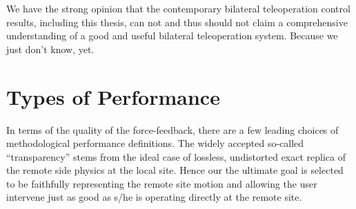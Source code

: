We have the strong opinion that the contemporary bilateral teleoperation control results, including this thesis, 
can not and thus should not claim a comprehensive understanding of a good and useful bilateral teleoperation 
system. Because we just don't know, yet.

\section{Types of Performance}

In terms of the quality of the force-feedback, there are a few leading choices of methodological performance 
definitions. The widely accepted so-called \enquote{transparency} stems from the ideal case of lossless, undistorted
exact replica of the remote side physics at the local site. Hence our the ultimate goal is selected to be 
faithfully representing the remote site motion and allowing the user intervene just as good as s/he is operating 
directly at the remote site. 

